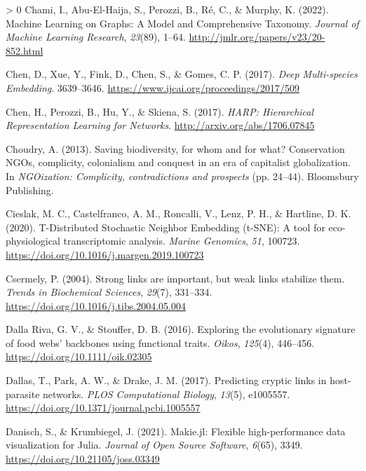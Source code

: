 \documentclass[11pt]{article}
\newlength{\cslhangindent}
\newenvironment{CSLReferences}[3] %
 {%
  \setlength{\parindent}{0pt}
  \ifodd #1 \everypar{\setlength{\hangindent}{\cslhangindent}}\ignorespaces\fi
  \ifnum #2 > 0
  \setlength{\parskip}{#2\baselineskip}
  \fi
 }%
 {}
\begin{document}
\begin{CSLReferences}{1}{0}
\leavevmode\hypertarget{ref-Chami2022MacLea}{}%
Chami, I., Abu-El-Haija, S., Perozzi, B., Ré, C., \& Murphy, K. (2022).
Machine Learning on Graphs: A Model and Comprehensive Taxonomy.
\emph{Journal of Machine Learning Research}, \emph{23}(89), 1--64.
\url{http://jmlr.org/papers/v23/20-852.html}

\leavevmode\hypertarget{ref-Chen2017DeeMul}{}%
Chen, D., Xue, Y., Fink, D., Chen, S., \& Gomes, C. P. (2017).
\emph{Deep Multi-species Embedding}. 3639--3646.
\url{https://www.ijcai.org/proceedings/2017/509}

\leavevmode\hypertarget{ref-Chen2017HarHie}{}%
Chen, H., Perozzi, B., Hu, Y., \& Skiena, S. (2017). \emph{HARP:
Hierarchical Representation Learning for Networks}.
\url{http://arxiv.org/abs/1706.07845}

\leavevmode\hypertarget{ref-Choudry2013SavBio}{}%
Choudry, A. (2013). Saving biodiversity, for whom and for what?
Conservation NGOs, complicity, colonialism and conquest in an era of
capitalist globalization. In \emph{NGOization: Complicity,
contradictions and prospects} (pp. 24--44). Bloomsbury Publishing.

\leavevmode\hypertarget{ref-Cieslak2020TdiSto}{}%
Cieslak, M. C., Castelfranco, A. M., Roncalli, V., Lenz, P. H., \&
Hartline, D. K. (2020). T-Distributed Stochastic Neighbor Embedding
(t-SNE): A tool for eco-physiological transcriptomic analysis.
\emph{Marine Genomics}, \emph{51}, 100723.
\url{https://doi.org/10.1016/j.margen.2019.100723}

\leavevmode\hypertarget{ref-Csermely2004StrLin}{}%
Csermely, P. (2004). Strong links are important, but weak links
stabilize them. \emph{Trends in Biochemical Sciences}, \emph{29}(7),
331--334. \url{https://doi.org/10.1016/j.tibs.2004.05.004}

\leavevmode\hypertarget{ref-DallaRiva2016ExpEvo}{}%
Dalla Riva, G. V., \& Stouffer, D. B. (2016). Exploring the evolutionary
signature of food webs' backbones using functional traits. \emph{Oikos},
\emph{125}(4), 446--456. \url{https://doi.org/10.1111/oik.02305}

\leavevmode\hypertarget{ref-Dallas2017PreCry}{}%
Dallas, T., Park, A. W., \& Drake, J. M. (2017). Predicting cryptic
links in host-parasite networks. \emph{PLOS Computational Biology},
\emph{13}(5), e1005557.
\url{https://doi.org/10.1371/journal.pcbi.1005557}

\leavevmode\hypertarget{ref-Danisch2021MakJl}{}%
Danisch, S., \& Krumbiegel, J. (2021). Makie.jl: Flexible
high-performance data visualization for Julia. \emph{Journal of Open
Source Software}, \emph{6}(65), 3349.
\url{https://doi.org/10.21105/joss.03349}


\end{CSLReferences}
\end{document}
